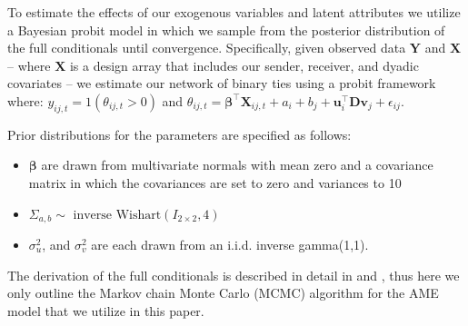 \documentclass[10pt,pdflatex,authoryear]{elsarticle}
\begin{document}
To estimate the effects of our exogenous variables and latent attributes we utilize a Bayesian probit model in which we sample from the posterior distribution of the full conditionals until convergence. Specifically, given observed data $\textbf{Y}$ and $\textbf{X}$ -- where $\textbf{X}$ is a design array that includes our sender, receiver, and dyadic covariates -- we estimate our network of binary ties using a probit framework where: $y_{ij,t} = 1(\theta_{ij,t}>0)$ and $\theta_{ij,t} = \bm\beta^{\top}\mathbf{X}_{ij,t} + a_{i} + b_{j} + \textbf{u}_{i}^{\top} \textbf{D} \textbf{v}_{j} + \epsilon_{ij}$. 

Prior distributions for the parameters are specified as follows: 

\begin{itemize}
  \item $\bm{\beta}$ are drawn from multivariate normals with mean zero and a covariance matrix in which the covariances are set to zero and variances to 10
  \item $\Sigma_{a,b} \sim \text{ inverse Wishart}(I_{2\times 2}, 4)$
  \item $\sigma_u^2$, and $\sigma_v^2$ are each drawn from an i.i.d. inverse gamma(1,1).
\end{itemize}

The derivation of the full conditionals is described in detail in \citet{hoff:2005} and \citet{hoff:2008}, thus here we only outline the Markov chain Monte Carlo (MCMC) algorithm for the AME model that we utilize in this paper.
\end{document}
